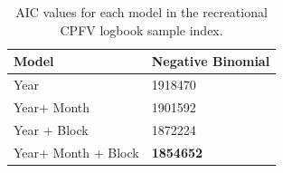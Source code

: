 \documentclass[12pt,]{article}
\begin{document}
\begin{table}[ht]
\centering
\caption{AIC values for each model in the
                                          recreational CPFV logbook sample 
                                          index.} 
\label{tab:Fleet5_RecPC_CPFVlogbook_aic}
\begin{tabular}{ll}
  \hline
Model & Negative Binomial \\ 
  \hline
Year & 1918470 \\ 
  Year+ Month & 1901592 \\ 
  Year + Block & 1872224 \\ 
  Year+ Month + Block & \textbf{1854652} \\ 
   \hline
\end{tabular}
\end{table}\vspace{2in}
\end{document}
